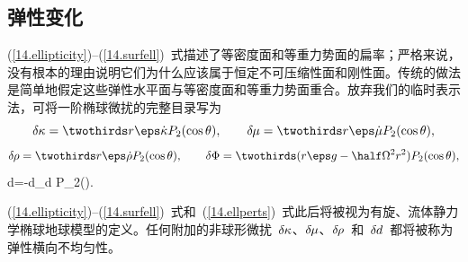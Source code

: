 \subsection{弹性变化}

(\ref{14.ellipticity})--(\ref{14.surfell})~式描述了等密度面和等重力势面的扁率；严格来说，没有根本的理由说明它们为什么应该属于恒定不可压缩性面和刚性面。传统的做法是简单地假定这些弹性水平面与等密度面和等重力势面重合。放弃我们的临时表示法，可将一阶椭球微扰的完整目录写为
\begin{displaymath}
\delta\hspace{-0.1 mm}\kappa=\twothirds r\eps\dot{\kappa}P_2(\cos\theta),
\qquad\delta\hspace{-0.2 mm}\mu=\twothirds r\eps\dot{\mu}P_2(\cos\theta),
\end{displaymath}
\begin{displaymath}
\delta\hspace{-0.2 mm}\rho=\twothirds r\eps\dot{\rho}P_2(\cos\theta),
\qquad\delta\Phi=\twothirds(r\eps g-\half\Omega^2 r^2)P_2(\cos\theta),
\end{displaymath}
\eq \label{14.ellperts}
\qquad\qquad\qquad
\delta\hspace{-0.1 mm}d=-\twothirds d\eps_{d} P_2(\cos\theta).
\en

(\ref{14.ellipticity})--(\ref{14.surfell})~式和~(\ref{14.ellperts})~式此后将被视为有旋、流体静力学椭球地球模型的定义。任何附加的非球形微扰~$\delta\hspace{-0.1 mm}\kappa$、$\delta\hspace{-0.2 mm}\mu$、$\delta\hspace{-0.2 mm}\rho$~和~$\delta\hspace{-0.1 mm}d$~都将被称为弹性横向不均匀性。

